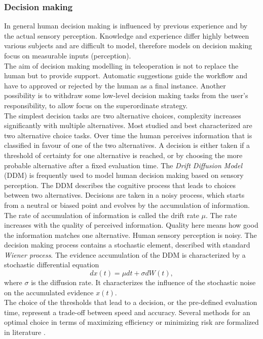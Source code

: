 \documentclass[a4paper,twoside, openright,12pt]{report}
\begin{document}
\subsubsection{Decision making}
In general human decision making is influenced by previous experience and by the actual sensory perception. Knowledge and experience differ highly between various subjects and are difficult to model, therefore models on decision making focus on measurable inputs (perception).\\
The aim of decision making modelling in teleoperation is not to replace the human but to provide support. Automatic suggestions guide the workflow and have to approved or rejected by the human as a final instance. Another possibility is to withdraw some low-level decision making tasks from the user's responsibility, to allow focus on the superordinate strategy.\\
The simplest decision tasks are two alternative choices, complexity increases significantly with multiple alternatives. Most studied and best characterized are two alternative choice tasks. Over time the human perceives information that is classified in favour of one of the two alternatives. A decision is either taken if a threshold of certainty for one alternative is reached, or by choosing the more probable alternative after a fixed evaluation time. The \emph{Drift Diffusion Model} (DDM) is frequently used to model human decision making based on sensory perception. The DDM describes the cognitive process that leads to choices between two alternatives. Decisions are taken in a noisy process, which starts from a neutral or biased point and evolves by the accumulation of information. The rate of accumulation of information is called the drift rate $\mu$. The rate increases with the quality of perceived information. Quality here means how good the information matches one alternative. Human sensory perception is noisy. The decision making process contains a stochastic element, described with standard \emph{Wiener process}.    The evidence accumulation of the DDM is characterized by a stochastic differential equation 
\begin{equation}
dx(t) = \mu dt + \sigma dW(t),
\end{equation}  
where $\sigma$ is the diffusion rate. It characterizes the influence of the stochastic noise on the accumulated evidence $x(t)$.\\
The choice of the thresholds that lead to a decision, or the pre-defined evaluation time, represent a trade-off between speed and accuracy. Several methods for an optimal choice in terms of maximizing efficiency or minimizing risk are formalized in literature \cite{Peters2015}.
\end{document}
